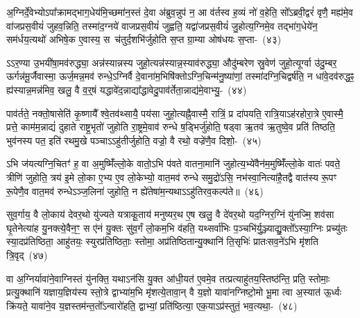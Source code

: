 {\anuvakamend[{वि वै य॒ज्ञः साम॑ च म॒ इत्या॑ह च ति॒स्रश्चैका॒न्नप॑ञ्चा॒शच्च॑}]}

अ॒ग्निर्दे॒वेभ्यो\-ऽपा᳚क्रामद्भाग॒\-धेय॑मि॒च्छमा॑न॒स्तं दे॒वा अ॑ब्रुव॒न्नुप॑ न॒ आ व॑र्तस्व ह॒व्यं नो॑ व॒हेति॒ सो᳚\-ऽब्रवी॒द्वरं॑ वृणै॒ मह्य॑मे॒व वा॑जप्रस॒वीयं॑ जुहव॒न्निति॒ तस्मा॑द॒ग्नये॑ वाजप्रस॒वीयं॑ जुह्वति॒ यद्वा॑जप्रस॒वीयं॑ जु॒होत्य॒ग्निमे॒व तद्भा॑ग॒धेये॑न॒ सम॑र्धय॒त्यथो॑ अभिषे॒क ए॒वास्य॒ स~च॑तुर्द॒शभि॑र्जुहोति स॒प्त ग्रा॒म्या ओष॑धयः स॒प्ता-~(४३)\ip

ऽऽर॒ण्या उ॒भयी॑षा॒मव॑रुद्ध्या॒ अन्न॑स्यान्नस्य जुहो॒त्यन्न॑स्यान्न॒स्याव॑रुद्ध्या॒ औदु॑म्बरेण स्रु॒वेण॑ जुहो॒त्यूर्ग्वा उ॑दु॒म्बर॒ ऊर्गन्न॑मू॒र्जैवास्मा॒ ऊर्ज॒मन्न॒मव॑ रुन्धे॒\-ऽग्निर्वै दे॒वाना॑म॒भिषि॑क्तो\-ऽग्नि॒चिन्म॑नु॒ष्या॑णां॒ तस्मा॑दग्नि॒चिद्वर्\mbox{}ष॑ति॒ न धा॑वे॒दव॑रुद्ध॒ꣴ॒ ह्य॑स्यान्न॒मन्न॑मिव॒ खलु॒ वै व॒र्॒\mbox{}षं यद्धावे॑द॒न्नाद्या᳚द्धावेदु॒पाव॑र्तेता॒न्नाद्य॑मे॒वाभ्यु॒-~(४४)\ip

पाव॑र्तते॒ नक्तो॒षासेति॑ कृ॒ष्णायै᳚ श्वे॒तव॑थ्सायै॒ पय॑सा जुहो॒त्यह्नै॒वास्मै॒ रात्रिं॒ प्र दा॑पयति॒ रात्रि॒या\-ऽह॑रहोरा॒त्रे ए॒वास्मै॒ प्रत्ते॒ काम॑म॒न्नाद्यं॑ दुहाते राष्ट्र॒भृतो॑ जुहोति रा॒ष्ट्रमे॒वाव॑ रुन्धे ष॒ड्भिर्जु॑होति॒ षड्वा ऋ॒तव॑ ऋ॒तुष्वे॒व प्रति॑ तिष्ठति॒ भुव॑नस्य पत॒ इति॑ रथमु॒खे पञ्चा\-ऽऽहु॑तीर्जुहोति॒ वज्रो॒ वै रथो॒ वज्रे॑णै॒व दिशो॒-~(४५)\ip

ऽभि ज॑यत्यग्नि॒चितꣳ॑ ह॒ वा अ॒मुष्मिँ॑ल्लो॒के वातो॒\-ऽभि प॑वते वातना॒मानि॑ जुहोत्य॒भ्ये॑वैन॑म॒मुष्मिँ॑ल्लो॒के वातः॑ पवते॒ त्रीणि॑ जुहोति॒ त्रय॑ इ॒मे लो॒का ए॒भ्य ए॒व लो॒केभ्यो॒ वात॒मव॑ रुन्धे समु॒द्रो॑\-ऽसि॒ नभ॑स्वा॒नित्या॑है॒तद्वै वात॑स्य रू॒पꣳ रू॒पेणै॒व वात॒मव॑ रुन्धे\-ऽञ्ज॒लिना॑ जुहोति॒ न ह्ये॑तेषा॑म॒न्यथा\-ऽऽहु॑तिरव॒कल्प॑ते॥~(४६)\ip

{\anuvakamend[{ओष॑धयः स॒प्ताभि दिशो॒\-ऽन्यथा॒ द्वे च॑}]}

सुव॒र्गाय॒ वै लो॒काय॑ देवर॒थो यु॑ज्यते यत्राकू॒ताय॑ मनुष्यर॒थ ए॒ष खलु॒ वै दे॑वर॒थो यद॒ग्निर॒ग्निं यु॑नज्मि॒ शव॑सा घृ॒तेनेत्या॑ह यु॒नक्त्ये॒वैन॒ꣳ॒ स ए॑नं यु॒क्तः सु॑व॒र्गं लो॒कम॒भि व॑हति॒ यथ्सर्वा॑भिः प॒ञ्चभि॑र्यु॒ञ्ज्याद्यु॒क्तो᳚\-ऽस्या॒ग्निः प्रच्यु॑तः स्या॒दप्र॑तिष्ठिता॒ आहु॑तयः॒ स्युरप्र॑तिष्ठिताः॒ स्तोमा॒ अप्र॑तिष्ठितान्यु॒क्थानि॑ ति॒सृभिः॑ प्रातःसव॒ने॑\-ऽभि मृ॑शति त्रि॒वृद्~(४७)\ip

वा अ॒ग्निर्यावा॑ने॒वाग्निस्तं यु॑नक्ति॒ यथा\-ऽन॑सि यु॒क्त आ॑धी॒यत॑ ए॒वमे॒व तत्प्रत्याहु॑तय॒स्\-तिष्ठ॑न्ति॒ प्रति॒ स्तोमाः॒ प्रत्यु॒क्थानि॑ यज्ञाय॒ज्ञिय॑स्य स्तो॒त्रे द्वाभ्या॑म॒भि मृ॑शत्ये॒तावा॒न् वै य॒ज्ञो यावा॑नग्निष्टो॒मो भू॒मा त्वा अ॒स्यात॑ ऊ॒र्ध्वः क्रि॑यते॒ यावा॑ने॒व य॒ज्ञस्तम॑न्त॒तो᳚\-ऽन्वारो॑हति॒ द्वाभ्यां॒ प्रति॑ष्ठित्या॒ एक॒या\-ऽप्र॑स्तुतं॒ भव॒त्यथा॒-~(४८)\ip

